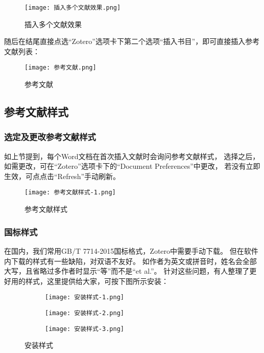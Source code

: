 \begin{figure}[!h]
    \centering
    \texttt{[image: 插入多个文献效果.png]}
    \caption{插入多个文献效果}
    \label{Zotero 6}
\end{figure}

随后在结尾直接点选“Zotero”选项卡下第二个选项“插入书目”，即可直接插入参考文献列表：
\begin{figure}[!h]
    \centering
    \texttt{[image: 参考文献.png]}
    \caption{参考文献}
    \label{Zotero 7}
\end{figure}

\subsection{参考文献样式}
\subsubsection{选定及更改参考文献样式}
如上节提到，每个Word文档在首次插入文献时会询问参考文献样式，
选择之后，如需更改，可在“Zotero”选项卡下的“Document Preferences”中更改，
若没有立即生效，可点点击“Refresh”手动刷新。
\begin{figure}[!h]
    \centering
    \texttt{[image: 参考文献样式-1.png]}
    \caption{参考文献样式}
    \label{Zotero 8}
\end{figure}

\subsubsection{国标样式}
在国内，我们常用GB/T 7714-2015国标格式，Zotero中需要手动下载。
但在软件内下载的样式有一些缺陷，对双语不友好。
如作者为英文或拼音时，姓名会全部大写，且省略过多作者时显示“等”而不是“et al.”。
针对这些问题，有人整理了更好用的样式，这里提供给大家，可按下图所示安装：

\begin{figure}[!h]
  \centering
  \begin{subfigure}[c]{0.9\textwidth}
      \texttt{[image: 安装样式-1.png]}
      \label{Zotero 9}
  \end{subfigure}
\end{figure}
  \hspace{-1em}

\begin{figure}[h]
  \centering
  \begin{subfigure}[c]{0.48\textwidth}
    \texttt{[image: 安装样式-2.png]}
    \label{Zotero 10-1}
  \end{subfigure}
  \begin{subfigure}[c]{0.48\textwidth}
    \texttt{[image: 安装样式-3.png]}
    \label{Zotero 10-2}
  \end{subfigure}
  \caption{安装样式}
  \label{Zotero 10}
\end{figure}

